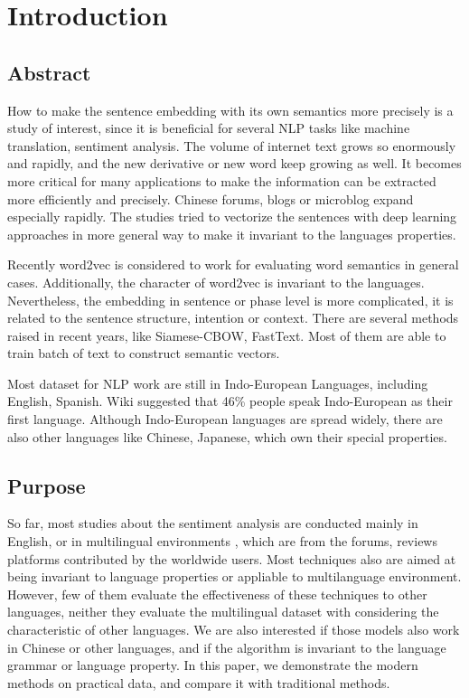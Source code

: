 \chapter{Introduction}
\setlength{\baselineskip}{1.5em}
\setlength{\parindent}{2em}
\setlength{\parskip}{1em}

\section{Abstract}

How to make the sentence embedding with its own semantics more precisely is a study of interest, since it is beneficial for several NLP tasks like machine translation, sentiment analysis. 
The volume of internet text grows so enormously and rapidly, and the new derivative or new word keep growing as well.
It becomes more critical for many applications to make the information can be extracted more efficiently and precisely.  
Chinese forums, blogs or microblog expand especially rapidly. The studies tried to vectorize the sentences with deep learning approaches in more general way to make it invariant to the languages properties.  


Recently word2vec\cite{word2vec} is considered to work for evaluating word semantics in general cases.  
Additionally, the character of word2vec is invariant to the languages. Nevertheless, 
the embedding in sentence or phase level is more complicated, it is related to the sentence structure,  
intention or context. There are several methods raised in recent years, like Siamese-CBOW, FastText. 
Most of them are able to train batch of text to construct semantic vectors.

Most dataset for NLP work are still in Indo-European Languages, including English, Spanish. Wiki suggested that 46\% people speak Indo-European as their first language. 
Although Indo-European languages are spread widely, there are also other languages like Chinese, Japanese, which own their special properties.

\section{Purpose}

So far, most studies about the sentiment analysis are conducted mainly in English, or in multilingual environments
, which are from the forums, reviews platforms contributed by the worldwide users. Most techniques also are aimed at being invariant to language properties or appliable to multilanguage environment. 
However, few of them evaluate the effectiveness of these techniques to other languages, neither they evaluate the multilingual dataset with considering the characteristic of other languages.   
We are also interested if those models also work in Chinese or other languages, and if the algorithm is invariant to the language grammar or language property. 
In this paper, we demonstrate the modern methods on practical data, and compare it with traditional methods.